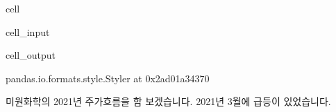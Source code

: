 \documentclass[letterpaper,10pt,english]{jupyterBook}
\begin{document}
\begin{sphinxuseclass}{cell}\begin{sphinxVerbatimInput}

\begin{sphinxuseclass}{cell_input}
\begin{sphinxVerbatim}[commandchars=\\\{\}]
 
\end{sphinxVerbatim}

\end{sphinxuseclass}\end{sphinxVerbatimInput}
\begin{sphinxVerbatimOutput}

\begin{sphinxuseclass}{cell_output}
\begin{sphinxVerbatim}[commandchars=\\\{\}]
\PYGZlt{}pandas.io.formats.style.Styler at 0x2ad01a34370\PYGZgt{}
\end{sphinxVerbatim}

\end{sphinxuseclass}\end{sphinxVerbatimOutput}

\end{sphinxuseclass}
\sphinxAtStartPar
 미원화학의 2021년 주가흐름을 함 보겠습니다. 2021년 3월에 급등이 있었습니다.
\end{document}
